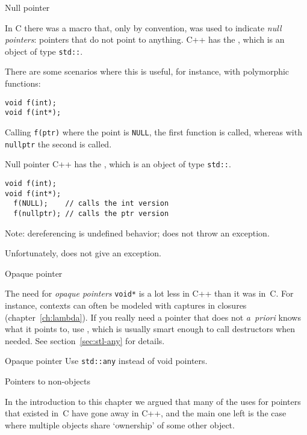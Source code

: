  {Null pointer}
\label{sec:null-ptr}

In C there was a macro  that, only by convention, was
used to indicate
\emph{null pointers}:
pointers that do not point to anything.
C++ has the , which is an object of type
\lstinline{std::}.

There are some scenarios where this is useful, for instance, with
polymorphic functions:
\begin{lstlisting}
void f(int);
void f(int*);
\end{lstlisting}
Calling \lstinline{f(ptr)} where the point is \lstinline{NULL}, the first function is
called, whereas with \lstinline{nullptr} the second is called.

\begin{slide}{Null pointer}
  \label{sl:cpp-nullptr}
  C++ has the , which is an object of type
  \lstinline{std::}.

\begin{lstlisting}
void f(int);
void f(int*);
  f(NULL);    // calls the int version
  f(nullptr); // calls the ptr version
\end{lstlisting}
Note: dereferencing is undefined behavior; does not throw an exception.
\end{slide}

Unfortunately,  does not give an exception.

 {Opaque pointer}

The need for \emph{opaque pointers}
\lstinline{void*}
is a lot less in C++ than it was in~C. For
instance, contexts can often be modeled with captures in closures
(chapter~\ref{ch:lambda}). If you really need a pointer that does not
\textit{a~priori} knows what it points to, use ,
which is usually smart enough to call destructors when needed.
See section~\ref{sec:stl-any} for details.


\begin{slide}{Opaque pointer}
  \label{sl:void-ptr}
  Use \lstinline{std::any} instead of void pointers.

\end{slide}

 {Pointers to non-objects}

In the introduction to this chapter we argued that many of the uses
for pointers that existed in~C have gone away in C++, and the main one
left is the case where multiple objects share `ownership' of some
other object.

